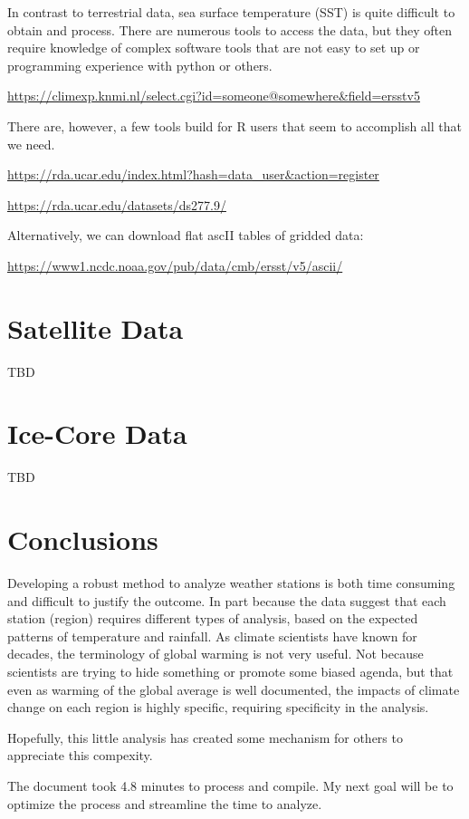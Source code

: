 \documentclass{article}\usepackage[]{graphicx}\usepackage[]{color}
\makeatletter
\newenvironment{kframe}{%
 \def\at@end@of@kframe{}%
 \ifinner\ifhmode%
  \def\at@end@of@kframe{\end{minipage}}%
  \begin{minipage}{\columnwidth}%
 \fi\fi%
 \def\FrameCommand##1{\hskip\@totalleftmargin \hskip-\fboxsep
 \colorbox{shadecolor}{##1}\hskip-\fboxsep
     \hskip-\linewidth \hskip-\@totalleftmargin \hskip\columnwidth}%
 \MakeFramed {\advance\hsize-\width
   \@totalleftmargin\z@ \linewidth\hsize
   \@setminipage}}%
 {\par\unskip\endMakeFramed%
 \at@end@of@kframe}
\newenvironment{knitrout}{}{} %
\makeatother
\begin{document}
In contrast to terrestrial data, sea surface temperature (SST) is quite difficult to obtain and process. There are numerous tools to access the data, but they often require knowledge of complex software tools that are not easy to set up or programming experience with python or others.

\url{https://climexp.knmi.nl/select.cgi?id=someone@somewhere&field=ersstv5}

There are, however, a few tools build for R users that seem to accomplish all that we need. 

\url{https://rda.ucar.edu/index.html?hash=data_user&action=register}

\url{https://rda.ucar.edu/datasets/ds277.9/}

Alternatively, we can download flat ascII tables of gridded data:

\url{https://www1.ncdc.noaa.gov/pub/data/cmb/ersst/v5/ascii/}




\section{Satellite Data}

TBD

\section{Ice-Core Data}

TBD

\section{Conclusions}

Developing a robust method to analyze weather stations is both time consuming and difficult to justify the outcome. In part because the data suggest that each station (region) requires different types of analysis, based on the expected patterns of temperature and rainfall. As climate scientists have known for decades, the terminology of global warming is not very useful. Not because scientists are trying to hide something or promote some biased agenda, but that even as warming of the global average is well documented, the impacts of climate change on each region is highly specific, requiring specificity in the analysis. 

Hopefully, this little analysis has created some mechanism for others to appreciate this compexity. 

\begin{knitrout}
\color{fgcolor}\begin{kframe}


{\ttfamily\noindent\bfseries{}}\end{kframe}
\end{knitrout}

The document took 4.8 minutes to process and compile. My next goal will be to optimize the process and streamline the time to analyze. 
\end{document}
